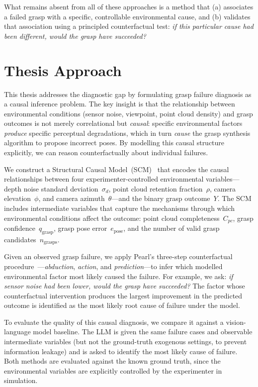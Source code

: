 \documentclass[11pt,a4paper]{report}
\begin{document}
What remains absent from all of these approaches is a method that (a) associates a failed grasp with a specific, controllable environmental cause, and (b) validates that association using a principled counterfactual test: \emph{if this particular cause had been different, would the grasp have succeeded?}

\section{Thesis Approach}
\label{sec:approach}

This thesis addresses the diagnostic gap by formulating grasp failure diagnosis as a causal inference problem. The key insight is that the relationship between environmental conditions (sensor noise, viewpoint, point cloud density) and grasp outcomes is not merely correlational but \emph{causal}: specific environmental factors \emph{produce} specific perceptual degradations, which in turn \emph{cause} the grasp synthesis algorithm to propose incorrect poses. By modelling this causal structure explicitly, we can reason counterfactually about individual failures.

We construct a Structural Causal Model~(SCM)~\cite{pearl2009causality} that encodes the causal relationships between four experimenter-controlled environmental variables---depth noise standard deviation~$\sigma_d$, point cloud retention fraction~$\rho$, camera elevation~$\phi$, and camera azimuth~$\theta$---and the binary grasp outcome~$Y$. The SCM includes intermediate variables that capture the mechanisms through which environmental conditions affect the outcome: point cloud completeness~$C_{pc}$, grasp confidence~$q_{\text{grasp}}$, grasp pose error~$e_{\text{pose}}$, and the number of valid grasp candidates~$n_{\text{grasps}}$.

Given an observed grasp failure, we apply Pearl's three-step counterfactual procedure~\cite{pearl2018book}---\emph{abduction}, \emph{action}, and \emph{prediction}---to infer which modelled environmental factor most likely caused the failure. For example, we ask: \emph{if sensor noise had been lower, would the grasp have succeeded?} The factor whose counterfactual intervention produces the largest improvement in the predicted outcome is identified as the most likely root cause of failure under the model.

To evaluate the quality of this causal diagnosis, we compare it against a vision-language model baseline. The LLM is given the same failure cases and observable intermediate variables (but not the ground-truth exogenous settings, to prevent information leakage) and is asked to identify the most likely cause of failure. Both methods are evaluated against the known ground truth, since the environmental variables are explicitly controlled by the experimenter in simulation.
\end{document}

